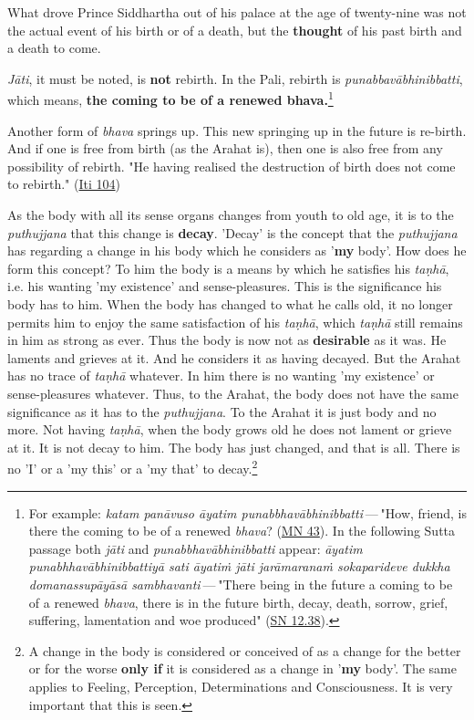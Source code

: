 What drove Prince Siddhartha out of his palace at the age of twenty-nine was not the actual event of his birth or of a death, but the \textbf{thought} of his past birth and a death to come.

\emph{Jāti}, it must be noted, is \textbf{not} rebirth. In the Pali, rebirth is \emph{punabbavābhinibbatti}, which means, \textbf{the coming to be of a renewed bhava.}\footnote{For example: \emph{katam panāvuso āyatim punabbhavābhinibbatti} --- "How, friend, is there the coming to be of a renewed \emph{bhava}? (\href{https://suttacentral.net/mn43/en/sujato}{MN 43}). In the following Sutta passage both \emph{jāti} and \emph{punabbhavābhinibbatti} appear: \emph{āyatim punabhhavābhinibbattiyā sati āyatiṁ jāti jarāmaranaṁ sokaparideve dukkha domanassupāyāsā sambhavanti} --- "There being in the future a coming to be of a renewed \emph{bhava}, there is in the future birth, decay, death, sorrow, grief, suffering, lamentation and woe produced" (\href{https://suttacentral.net/sn12.38/en/bodhi}{SN 12.38}).}

Another form of \emph{bhava} springs up. This new springing up in the future is re-birth. And if one is free from birth (as the Arahat is), then one is also free from any possibility of rebirth. "He having realised the destruction of birth does not come to rebirth." (\href{https://suttacentral.net/iti104/en/sujato}{Iti 104})

As the body with all its sense organs changes from youth to old age, it is to the \emph{puthujjana} that this change is \textbf{decay}. 'Decay' is the concept that the \emph{puthujjana} has regarding a change in his body which he considers as '\textbf{my} body'. How does he form this concept? To him the body is a means by which he satisfies his \emph{taṇhā}, i.e. his wanting 'my existence' and sense-pleasures. This is the significance his body has to him. When the body has changed to what he calls old, it no longer permits him to enjoy the same satisfaction of his \emph{taṇhā}, which \emph{taṇhā} still remains in him as strong as ever. Thus the body is now not as \textbf{desirable} as it was. He laments and grieves at it. And he considers it as having decayed. But the Arahat has no trace of \emph{taṇhā} whatever. In him there is no wanting 'my existence' or sense-pleasures whatever. Thus, to the Arahat, the body does not have the same significance as it has to the \emph{puthujjana}. To the Arahat it is just body and no more. Not having \emph{taṇhā}, when the body grows old he does not lament or grieve at it. It is not decay to him. The body has just changed, and that is all. There is no 'I' or a 'my this' or a 'my that' to decay.\footnote{A change in the body is considered or conceived of as a change for the better or for the worse \textbf{only if} it is considered as a change in '\textbf{my} body'. The same applies to Feeling, Perception, Determinations and Consciousness. It is very important that this is seen.}


